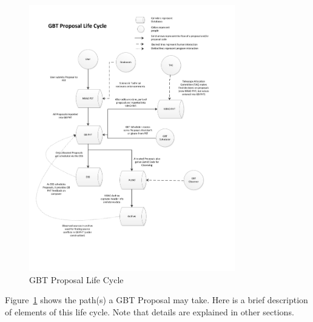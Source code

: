 \documentclass{article}
\begin{document}
\begin{figure}[h!]
\centering
\includegraphics[width=0.8\textwidth]{ProposalLifeCycle.pdf}
\caption{GBT Proposal Life Cycle}
\label{proposal_life_cycle_image}
\end{figure}

Figure~\ref{proposal_life_cycle_image} shows the path(s) a GBT Proposal may take.
Here is a brief description of elements of this life cycle.  Note that details
are explained in other sections.
\end{document}
